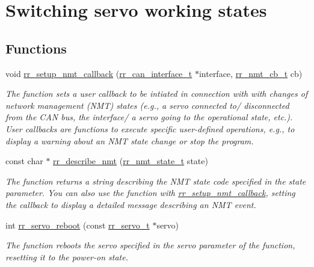 \hypertarget{group___state}{}\section{Switching servo working states}
\label{group___state}
\subsection*{Functions}
\begin{DoxyCompactItemize}
\item 
void \hyperlink{group___state_ga2433f49950ad40f06537287b52852c13}{rr\+\_\+setup\+\_\+nmt\+\_\+callback} (\hyperlink{structrr__can__interface__t}{rr\+\_\+can\+\_\+interface\+\_\+t} $\ast$interface, \hyperlink{api_8h_ae0f9f2b200672126bb1f6eb3e66c27fc}{rr\+\_\+nmt\+\_\+cb\+\_\+t} cb)
\begin{DoxyCompactList}\small\item\em The function sets a user callback to be intiated in connection with with changes of network management (N\+MT) states (e.\+g., a servo connected to/ disconnected from the C\+AN bus, the interface/ a servo going to the operational state, etc.). User callbacks are functions to execute specific user-\/defined operations, e.\+g., to display a warning about an N\+MT state change or stop the program. \end{DoxyCompactList}\item 
const char $\ast$ \hyperlink{group___state_ga91beec8d2ca8ea03583c21a285297861}{rr\+\_\+describe\+\_\+nmt} (\hyperlink{api_8h_afaf255d20b35be64a488b42e11feab29}{rr\+\_\+nmt\+\_\+state\+\_\+t} state)
\begin{DoxyCompactList}\small\item\em The function returns a string describing the N\+MT state code specified in the \textquotesingle{}state\textquotesingle{} parameter. You can also use the function with \hyperlink{group___state_ga2433f49950ad40f06537287b52852c13}{rr\+\_\+setup\+\_\+nmt\+\_\+callback}, setting the callback to display a detailed message describing an N\+MT event. \end{DoxyCompactList}\item 
int \hyperlink{group___state_ga1239a8f4a80ea1c33f599a0cdc58048c}{rr\+\_\+servo\+\_\+reboot} (const \hyperlink{structrr__servo__t}{rr\+\_\+servo\+\_\+t} $\ast$servo)
\begin{DoxyCompactList}\small\item\em The function reboots the servo specified in the \textquotesingle{}servo\textquotesingle{} parameter of the function, resetting it to the power-\/on state. \end{DoxyCompactList}\item 

\end{DoxyCompactItemize}
